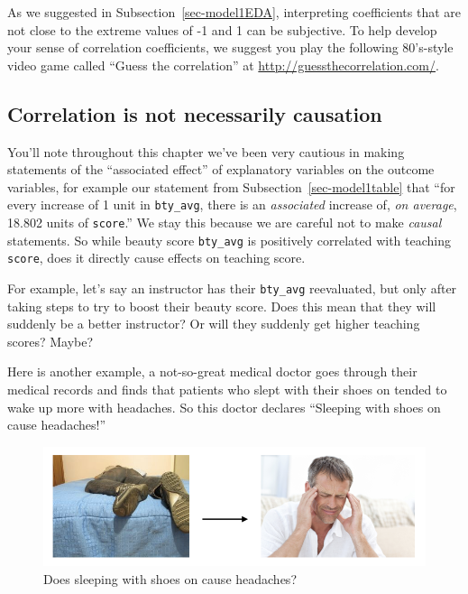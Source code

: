 \documentclass[
  letterpaper,
  DIV=11,
  numbers=noendperiod]{scrreprt}
\theoremstyle{definition}
\theoremstyle{remark}
\begin{document}
As we suggested in Subsection~\ref{sec-model1EDA}, interpreting
coefficients that are not close to the extreme values of -1 and 1 can be
subjective. To help develop your sense of correlation coefficients, we
suggest you play the following 80's-style video game called ``Guess the
correlation'' at \url{http://guessthecorrelation.com/}.

\hypertarget{sec-correlation-is-not-causation}{%
\subsection{Correlation is not necessarily
causation}\label{sec-correlation-is-not-causation}}

You'll note throughout this chapter we've been very cautious in making
statements of the ``associated effect'' of explanatory variables on the
outcome variables, for example our statement from
Subsection~\ref{sec-model1table} that ``for every increase of 1 unit in
\texttt{bty\_avg}, there is an \emph{associated} increase of, \emph{on
average}, 18.802 units of \texttt{score}.'' We stay this because we are
careful not to make \emph{causal} statements. So while beauty score
\texttt{bty\_avg} is positively correlated with teaching \texttt{score},
does it directly cause effects on teaching score.

For example, let's say an instructor has their \texttt{bty\_avg}
reevaluated, but only after taking steps to try to boost their beauty
score. Does this mean that they will suddenly be a better instructor? Or
will they suddenly get higher teaching scores? Maybe?

Here is another example, a not-so-great medical doctor goes through
their medical records and finds that patients who slept with their shoes
on tended to wake up more with headaches. So this doctor declares
``Sleeping with shoes on cause headaches!''

\begin{figure}

{\centering \includegraphics{images/flowcharts/flowchart.010-cropped.png}

}

\caption{\label{fig-sleep-shoes-on}Does sleeping with shoes on cause
headaches?}

\end{figure}
\end{document}

